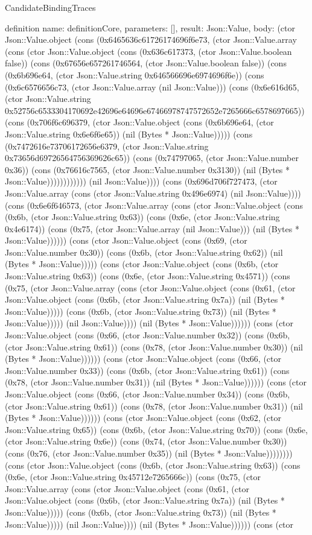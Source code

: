 \begin{lexlean}{CandidateBindingTraces}
\begin{semanticmodule}
definition{
 name: definitionCore,
 parameters: [],
 result: Json::Value,
 body: (ctor Json::Value.object (cons (0x6465636c61726174696f6e73, (ctor Json::Value.array (cons (ctor Json::Value.object (cons (0x636c617373, (ctor Json::Value.boolean false)) (cons (0x67656e657261746564, (ctor Json::Value.boolean false)) (cons (0x6b696e64, (ctor Json::Value.string 0x646566696e6974696f6e)) (cons (0x6c6576656c73, (ctor Json::Value.array (nil Json::Value))) (cons (0x6e616d65, (ctor Json::Value.string 0x52756c6533304170692e42696e64696e67466978747572652e7265666c6578697665)) (cons (0x706f6c696379, (ctor Json::Value.object (cons (0x6b696e64, (ctor Json::Value.string 0x6e6f6e65)) (nil (Bytes * Json::Value))))) (cons (0x7472616e73706172656e6379, (ctor Json::Value.string 0x73656d69726564756369626c65)) (cons (0x74797065, (ctor Json::Value.number 0x36)) (cons (0x76616c7565, (ctor Json::Value.number 0x3130)) (nil (Bytes * Json::Value)))))))))))) (nil Json::Value)))) (cons (0x696d706f727473, (ctor Json::Value.array (cons (ctor Json::Value.string 0x496e6974) (nil Json::Value)))) (cons (0x6e6f646573, (ctor Json::Value.array (cons (ctor Json::Value.object (cons (0x6b, (ctor Json::Value.string 0x63)) (cons (0x6e, (ctor Json::Value.string 0x4e6174)) (cons (0x75, (ctor Json::Value.array (nil Json::Value))) (nil (Bytes * Json::Value)))))) (cons (ctor Json::Value.object (cons (0x69, (ctor Json::Value.number 0x30)) (cons (0x6b, (ctor Json::Value.string 0x62)) (nil (Bytes * Json::Value))))) (cons (ctor Json::Value.object (cons (0x6b, (ctor Json::Value.string 0x63)) (cons (0x6e, (ctor Json::Value.string 0x4571)) (cons (0x75, (ctor Json::Value.array (cons (ctor Json::Value.object (cons (0x61, (ctor Json::Value.object (cons (0x6b, (ctor Json::Value.string 0x7a)) (nil (Bytes * Json::Value))))) (cons (0x6b, (ctor Json::Value.string 0x73)) (nil (Bytes * Json::Value))))) (nil Json::Value)))) (nil (Bytes * Json::Value)))))) (cons (ctor Json::Value.object (cons (0x66, (ctor Json::Value.number 0x32)) (cons (0x6b, (ctor Json::Value.string 0x61)) (cons (0x78, (ctor Json::Value.number 0x30)) (nil (Bytes * Json::Value)))))) (cons (ctor Json::Value.object (cons (0x66, (ctor Json::Value.number 0x33)) (cons (0x6b, (ctor Json::Value.string 0x61)) (cons (0x78, (ctor Json::Value.number 0x31)) (nil (Bytes * Json::Value)))))) (cons (ctor Json::Value.object (cons (0x66, (ctor Json::Value.number 0x34)) (cons (0x6b, (ctor Json::Value.string 0x61)) (cons (0x78, (ctor Json::Value.number 0x31)) (nil (Bytes * Json::Value)))))) (cons (ctor Json::Value.object (cons (0x62, (ctor Json::Value.string 0x65)) (cons (0x6b, (ctor Json::Value.string 0x70)) (cons (0x6e, (ctor Json::Value.string 0x6e)) (cons (0x74, (ctor Json::Value.number 0x30)) (cons (0x76, (ctor Json::Value.number 0x35)) (nil (Bytes * Json::Value)))))))) (cons (ctor Json::Value.object (cons (0x6b, (ctor Json::Value.string 0x63)) (cons (0x6e, (ctor Json::Value.string 0x45712e7265666c)) (cons (0x75, (ctor Json::Value.array (cons (ctor Json::Value.object (cons (0x61, (ctor Json::Value.object (cons (0x6b, (ctor Json::Value.string 0x7a)) (nil (Bytes * Json::Value))))) (cons (0x6b, (ctor Json::Value.string 0x73)) (nil (Bytes * Json::Value))))) (nil Json::Value)))) (nil (Bytes * Json::Value)))))) (cons (ctor }
\end{semanticmodule}
\end{lexlean}
